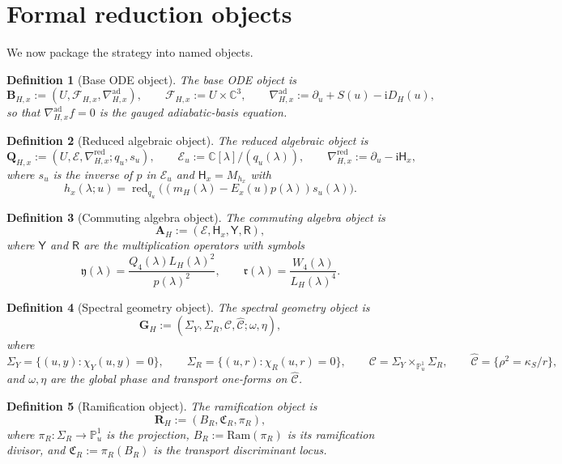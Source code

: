 \documentclass[11pt]{article}
\newcommand{\C}{\mathbb C}
\newcommand{\PP}{\mathbb P}
\newcommand{\ii}{\mathrm{i}}
\newcommand{\CY}{\Sigma_Y}
\newcommand{\CR}{\Sigma_R}
\newcommand{\Chat}{\widehat{\mathcal C}}
\newcommand{\Cu}{\mathcal C}
\newcommand{\Eu}{\mathcal E}
\newcommand{\Hx}{\mathsf H_x}
\newcommand{\Yop}{\mathsf Y}
\newcommand{\Rop}{\mathsf R}
\newcommand{\CRam}{\mathfrak C_R}
\newtheorem{definition}{Definition}[section]
\begin{document}
\section{Formal reduction objects}

We now package the strategy into named objects.

\begin{definition}[Base ODE object]
\label{def:base-object}
The \emph{base ODE object} is
\[
\mathbf B_{H,x}:=(U,\mathcal F_{H,x},\nabla^{\mathrm{ad}}_{H,x}),
\qquad
\mathcal F_{H,x}:=U\times\C^3,
\qquad
\nabla^{\mathrm{ad}}_{H,x}:=\partial_u+S(u)-\ii D_H(u),
\]
so that $\nabla^{\mathrm{ad}}_{H,x}f=0$ is the gauged adiabatic-basis equation.
\end{definition}

\begin{definition}[Reduced algebraic object]
\label{def:reduced-object}
The \emph{reduced algebraic object} is
\[
\mathbf Q_{H,x}:=(U,\Eu,\nabla^{\mathrm{red}}_{H,x};q_u,s_u),
\qquad
\Eu_u:=\C[\lambda]/(q_u(\lambda)),
\qquad
\nabla^{\mathrm{red}}_{H,x}:=\partial_u-\ii\Hx,
\]
where $s_u$ is the inverse of $p$ in $\Eu_u$ and $\Hx=M_{h_x}$ with
\[
h_x(\lambda;u)=\operatorname{red}_{q_u}\bigl((m_H(\lambda)-E_x(u)p(\lambda))s_u(\lambda)\bigr).
\]
\end{definition}

\begin{definition}[Commuting algebra object]
\label{def:alg-object}
The \emph{commuting algebra object} is
\[
\mathbf A_H:=(\Eu,\Hx,\Yop,\Rop),
\]
where $\Yop$ and $\Rop$ are the multiplication operators with symbols
\[
\mathfrak y(\lambda)=\frac{Q_4(\lambda)L_H(\lambda)^2}{p(\lambda)^2},
\qquad
\mathfrak r(\lambda)=\frac{W_4(\lambda)}{L_H(\lambda)^4}.
\]
\end{definition}

\begin{definition}[Spectral geometry object]
\label{def:geom-object}
The \emph{spectral geometry object} is
\[
\mathbf G_H:=(\CY,\CR,\Cu,\Chat;\omega,\eta),
\]
where
\[
\CY=\{(u,y):\chi_Y(u,y)=0\},
\qquad
\CR=\{(u,r):\chi_R(u,r)=0\},
\qquad
\Cu=\CY\times_{\PP^1_u}\CR,
\qquad
\Chat=\{\rho^2=\kappa_S/r\},
\]
and $\omega,\eta$ are the global phase and transport one-forms on $\Chat$.
\end{definition}

\begin{definition}[Ramification object]
\label{def:ram-object}
The \emph{ramification object} is
\[
\mathbf R_H:=(B_R,\CRam,\pi_R),
\]
where $\pi_R:\CR\to \PP^1_u$ is the projection, $B_R:=\mathrm{Ram}(\pi_R)$ is its ramification divisor, and $\CRam:=\pi_R(B_R)$ is the transport discriminant locus.
\end{definition}
\end{document}
